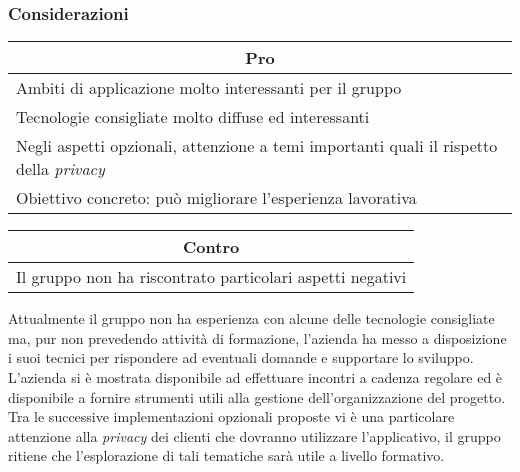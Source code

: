 \subsubsection{Considerazioni}
\begin{minipage}[t]{0.45\linewidth}
    \vspace{0pt}
    {\renewcommand{\arraystretch}{1.5}
    \begin{tabular}{p{1\linewidth}}
        \multicolumn{1}{c}{\textbf{Pro}}                        \\
        \midrule
        Ambiti di applicazione molto interessanti per il gruppo \\
        Tecnologie consigliate molto diffuse ed interessanti    \\
        Negli aspetti opzionali, attenzione a temi importanti quali il rispetto della \textit{privacy}    \\
        Obiettivo concreto: può migliorare l'esperienza lavorativa                  \\
        \hline
    \end{tabular}
    }
\end{minipage}
\hspace{0.05\linewidth}
\begin{minipage}[t]{0.45\linewidth}
    \vspace{0pt}
    {\renewcommand{\arraystretch}{1.5}
    \begin{tabular}{p{1\linewidth}}
        \multicolumn{1}{c}{\textbf{Contro}} \\
        \midrule
        Il gruppo non ha riscontrato particolari aspetti negativi \\
        \hline
    \end{tabular}
    }
\end{minipage}
\vspace{1em}

\noindent
Attualmente il gruppo non ha esperienza con alcune delle tecnologie consigliate ma, pur non prevedendo attività di formazione, l'azienda ha messo a disposizione i suoi tecnici per rispondere ad eventuali domande e supportare lo sviluppo.\\
L'azienda si è mostrata disponibile ad effettuare incontri a cadenza regolare ed è disponibile a fornire strumenti utili alla gestione dell'organizzazione del progetto. 
Tra le successive implementazioni opzionali proposte vi è una particolare attenzione alla \textit{privacy} dei clienti che dovranno utilizzare l'applicativo, il gruppo ritiene che l'esplorazione di tali tematiche sarà utile a livello formativo.

